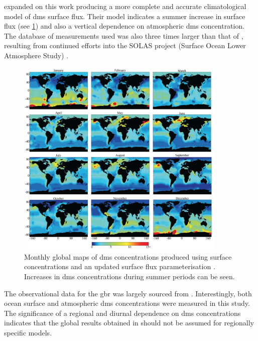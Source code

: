 	\citet{lana2011updated} expanded on this work producing a more complete and accurate climatological model of \gls{dms} surface flux. Their model indicates a summer increase in surface flux (see \cref{fig:lanadmsmaps}) and also a vertical dependence on atmospheric \gls{dms} concentration. The database of measurements used was also three times larger than that of \citet{kettle1999global}, resulting from continued efforts into the SOLAS project (Surface Ocean Lower Atmosphere Study) \citep{lana2011updated}.

	\begin{figure}[!htb]
	    \centering
	    \includegraphics[width=0.9\textwidth,natwidth=1414,natheight=1344]{Fig/Literature_Review/lanadmsmaps.png}
	    \caption{Monthly global maps of \gls{dms} concentrations produced using surface concentrations and an updated surface flux parameterisation \citep{lana2011updated}. Increases in \gls{dms} concentrations during summer periods can be seen.}
	    \label{fig:lanadmsmaps}
	\end{figure}

	The observational data for the \gls{gbr} was largely sourced from \citet{jones:2005ez}. Interestingly, both ocean surface and atmospheric \gls{dms} concentrations were measured in this study. The significance of a regional and diurnal dependence on \gls{dms} concentrations indicates that the global results obtained in \citet{lana2011updated} should not be assumed for regionally specific models.



